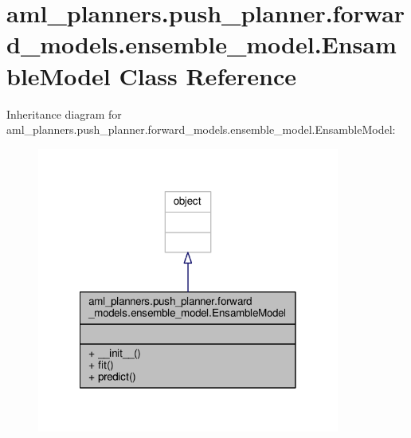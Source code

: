 \hypertarget{classaml__planners_1_1push__planner_1_1forward__models_1_1ensemble__model_1_1_ensamble_model}{\section{aml\-\_\-planners.\-push\-\_\-planner.\-forward\-\_\-models.\-ensemble\-\_\-model.\-Ensamble\-Model Class Reference}
\label{classaml__planners_1_1push__planner_1_1forward__models_1_1ensemble__model_1_1_ensamble_model}
}


Inheritance diagram for aml\-\_\-planners.\-push\-\_\-planner.\-forward\-\_\-models.\-ensemble\-\_\-model.\-Ensamble\-Model\-:\nopagebreak
\begin{figure}[H]
\begin{center}
\leavevmode
\includegraphics[width=282pt]{classaml__planners_1_1push__planner_1_1forward__models_1_1ensemble__model_1_1_ensamble_model__inherit__graph}
\end{center}
\end{figure}


